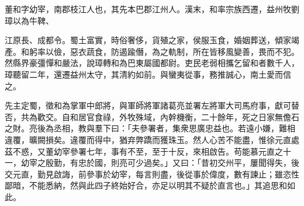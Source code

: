 \begin{pinyinscope}
 
 
 董和字幼宰，南郡枝江人也，其先本巴郡江州人。漢末，和率宗族西遷，益州牧劉璋以為牛鞞、
 
 
 江原長、成都令。蜀土富實，時俗奢侈，貨殖之家，侯服玉食，婚姻葬送，傾家竭產。和躬率以儉，惡衣蔬食，防遏踰僭，為之軌制，所在皆移風變善，畏而不犯。然縣界豪彊憚和嚴法，說璋轉和為巴東屬國都尉。吏民老弱相攜乞留和者數千人，璋聽留二年，還遷益州太守，其清約如前。與蠻夷從事，務推誠心，南土愛而信之。
 
 
先主定蜀，徵和為掌軍中郎將，與軍師將軍諸葛亮並署左將軍大司馬府事，獻可替否，共為歡交。自和居官食祿，外牧殊域，內幹機衡，二十餘年，死之日家無儋石之財。亮後為丞相，教與羣下曰：「夫參署者，集衆思廣忠益也。若遠小嫌，難相違覆，曠闕損矣。違覆而得中，猶弃弊蹻而獲珠玉。然人心苦不能盡，惟徐元直處茲不惑，又董幼宰參署七年，事有不至，至于十反，來相啟告。苟能慕元直之十一，幼宰之殷勤，有忠於國，則亮可少過矣。」又曰：「昔初交州平，屢聞得失，後交元直，勤見啟誨，前參事於幼宰，每言則盡，後從事於偉度，數有諫止；雖恣性鄙暗，不能悉納，然與此四子終始好合，亦足以明其不疑於直言也。」其追思和如此。
 
 
\end{pinyinscope}